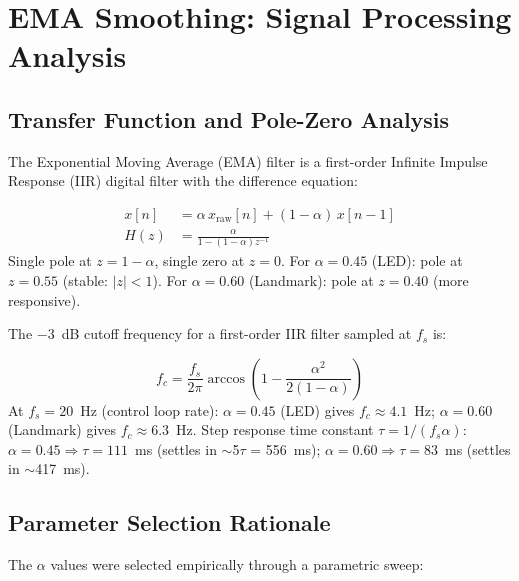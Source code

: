 \section{EMA Smoothing: Signal Processing Analysis}

\subsection{Transfer Function and Pole-Zero Analysis}

The Exponential Moving Average (EMA) filter is a first-order Infinite Impulse Response (IIR) digital filter with the difference equation:

\begin{eqblock}
\begin{align}
x[n] &= \alpha \, x_{\text{raw}}[n] + (1-\alpha)\, x[n-1] \\
H(z) &= \frac{\alpha}{1 - (1-\alpha) z^{-1}}
\end{align}
Single pole at $z = 1-\alpha$, single zero at $z=0$. For $\alpha=0.45$ (LED): pole at $z=0.55$ (stable: $|z|<1$). For $\alpha=0.60$ (Landmark): pole at $z=0.40$ (more responsive).
\end{eqblock}

The $-3$~dB cutoff frequency for a first-order IIR filter sampled at $f_s$ is:

\begin{eqblock}
\begin{equation}
f_c = \frac{f_s}{2\pi} \arccos\!\left(1 - \frac{\alpha^2}{2(1-\alpha)}\right)
\end{equation}
At $f_s = 20$~Hz (control loop rate): $\alpha=0.45$ (LED) gives $f_c \approx 4.1$~Hz; $\alpha=0.60$ (Landmark) gives $f_c \approx 6.3$~Hz. Step response time constant $\tau = 1/(f_s \alpha)$: $\alpha=0.45 \Rightarrow \tau = 111$~ms (settles in $\sim$5$\tau$ = 556~ms); $\alpha=0.60 \Rightarrow \tau = 83$~ms (settles in $\sim$417~ms).
\end{eqblock}

\subsection{Parameter Selection Rationale}

The $\alpha$ values were selected empirically through a parametric sweep:

